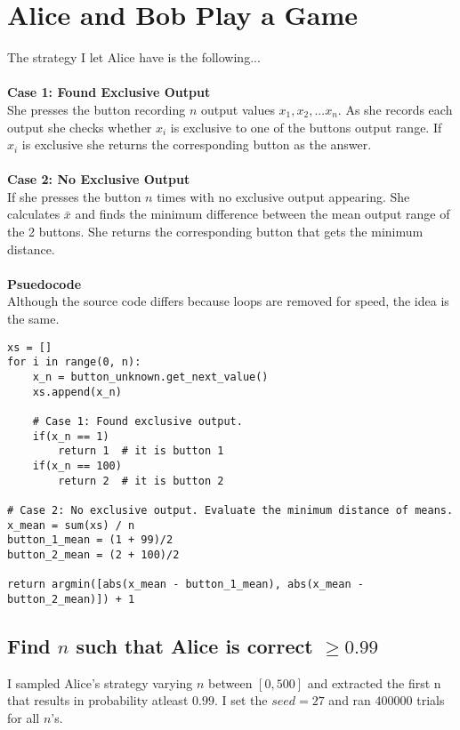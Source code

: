 \documentclass[twocolumn]{article}
\begin{document}
\section{Alice and Bob Play a Game}
The strategy I let Alice have is the following...
\\
\\

\noindent
\textbf{Case 1: Found Exclusive Output}\\
She presses the button recording $n$ output values $x_1, x_2, ... x_n$.
As she records each output she checks whether $x_i$ is exclusive to one of the buttons output range. If $x_i$ is exclusive she returns the corresponding button as the answer.
\\
\\

\textbf{Case 2: No Exclusive Output}\\
If she presses the button $n$ times with no exclusive output appearing. She calculates $\bar{x}$ and finds the minimum difference between the mean output range of the 2 buttons. She returns the corresponding button that gets the minimum distance.
\\
\\

\textbf{Psuedocode}\\
Although the source code differs because loops are removed for speed, the idea is the same.

\begin{lstlisting}
xs = []
for i in range(0, n):	
	x_n = button_unknown.get_next_value()
	xs.append(x_n) 	
	
	# Case 1: Found exclusive output.
	if(x_n == 1)
		return 1  # it is button 1
	if(x_n == 100)
		return 2  # it is button 2
		
# Case 2: No exclusive output. Evaluate the minimum distance of means.
x_mean = sum(xs) / n
button_1_mean = (1 + 99)/2
button_2_mean = (2 + 100)/2

return argmin([abs(x_mean - button_1_mean), abs(x_mean - button_2_mean)]) + 1
\end{lstlisting}

\subsection*{Find $n$ such that Alice is correct $\ge 0.99$}
I sampled Alice's strategy varying $n$ between $[0, 500]$ and extracted the first n that results in probability atleast $0.99$. I set the $seed=27$ and  ran $400000$ trials for all $n$'s.
\end{document}
